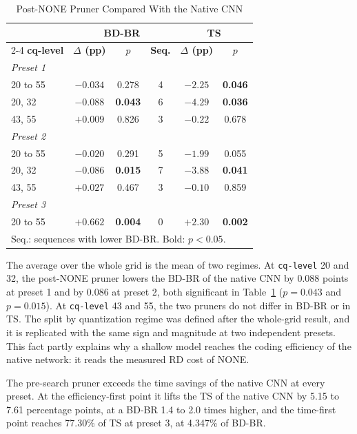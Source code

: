 \documentclass[conference]{IEEEtran}
\begin{document}
\begin{table}[!t]
\renewcommand{\arraystretch}{1.1}
\caption{Post-NONE Pruner Compared With the Native CNN}
\label{tab_ttest}
\centering
\setlength{\tabcolsep}{5pt}
\begin{tabular}{lccccc}
\hline
 & \multicolumn{3}{c}{\textbf{BD-BR}} & \multicolumn{2}{c}{\textbf{TS}} \\
\cline{2-4}\cline{5-6}
\textbf{cq-level} & \textbf{$\Delta$ (pp)} & \textbf{$p$} & \textbf{Seq.}
 & \textbf{$\Delta$ (pp)} & \textbf{$p$} \\
\hline
\multicolumn{6}{l}{\textit{Preset 1}} \\
20 to 55 & $-0.034$ & 0.278 & 4 & $-2.25$ & \textbf{0.046} \\
20, 32 & $-0.088$ & \textbf{0.043} & 6 & $-4.29$ & \textbf{0.036} \\
43, 55 & $+0.009$ & 0.826 & 3 & $-0.22$ & 0.678 \\
\multicolumn{6}{l}{\textit{Preset 2}} \\
20 to 55 & $-0.020$ & 0.291 & 5 & $-1.99$ & 0.055 \\
20, 32 & $-0.086$ & \textbf{0.015} & 7 & $-3.88$ & \textbf{0.041} \\
43, 55 & $+0.027$ & 0.467 & 3 & $-0.10$ & 0.859 \\
\multicolumn{6}{l}{\textit{Preset 3}} \\
20 to 55 & $+0.662$ & \textbf{0.004} & 0 & $+2.30$ & \textbf{0.002} \\
\hline
\multicolumn{6}{l}{\footnotesize Seq.: sequences with lower BD-BR. Bold: $p < 0.05$.}
\end{tabular}
\end{table}

The average over the whole grid is the mean of two regimes. At
\texttt{cq-level} 20 and 32, the post-NONE pruner lowers the BD-BR of the native
CNN by 0.088 points at preset 1 and by 0.086 at preset 2, both significant in
Table~\ref{tab_ttest} ($p = 0.043$ and $p = 0.015$). At \texttt{cq-level} 43 and 55, the two pruners do not differ in
BD-BR or in TS. The split by quantization regime was defined after the
whole-grid result, and it is replicated with the same sign and magnitude at two
independent presets. This fact partly explains why a shallow model reaches the
coding efficiency of the native network: it reads the measured RD cost of NONE.

The pre-search pruner exceeds the time savings of the native CNN at every
preset. At the efficiency-first point it lifts the TS of the native CNN by 5.15
to 7.61 percentage points, at a BD-BR 1.4 to 2.0 times higher, and the
time-first point reaches 77.30\% of TS at preset 3, at 4.347\% of BD-BR.
\end{document}
